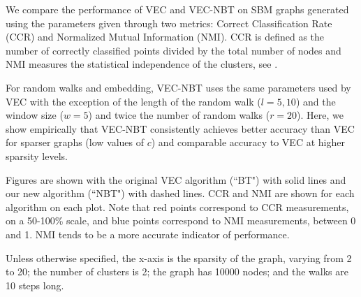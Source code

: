\documentclass{article} %
\begin{document}
We compare the performance of VEC and VEC-NBT on SBM graphs generated using the parameters given through two metrics: Correct Classification Rate (CCR) and Normalized Mutual Information (NMI). CCR is defined as the number of correctly classified points divided by the total number of nodes and NMI measures the statistical independence of the clusters, see \cite{}.


For random walks and embedding, VEC-NBT uses the same parameters used by VEC with the exception of the length of the random walk ($l=5, 10$) and the window size ($w=5$) and twice the number of random walks ($r=20$). Here, we show empirically that VEC-NBT consistently achieves better accuracy than VEC for sparser graphs (low values of $c$) and comparable accuracy to VEC at higher sparsity levels.

%

Figures are shown with the original VEC algorithm (``BT") with solid lines and our new algorithm (``NBT") with dashed lines. CCR and NMI are shown for each algorithm on each plot. Note that red points correspond to CCR measurements, on a 50-100\% scale, and blue points correspond to NMI measurements, between 0 and 1. NMI tends to be a more accurate indicator of performance.

Unless otherwise specified, the x-axis is the sparsity of the graph, varying from 2 to 20; the number of clusters is 2; the graph has 10000 nodes; and the walks are 10 steps long.
\end{document}
